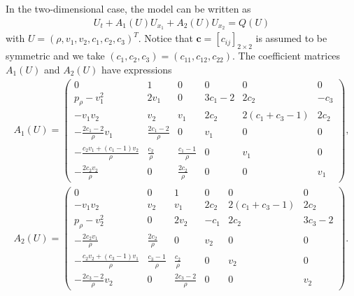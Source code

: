 \documentclass{article}
\theoremstyle{plain}
\begin{document}
In the two-dimensional case, the model can be written as
\begin{eqnarray}\label{25}
  U_t + A_1(U) U_{x_1} + A_2(U) U_{x_2} =Q(U)
\end{eqnarray}
with $U = (\rho, v_1, v_2, c_1, c_2, c_3)^T$.
Notice that $\mathbf{c}=[c_{ij}]_{2\times 2}$ is assumed to be symmetric and we take $(c_1, c_2, c_3)= (c_{11}, c_{12}, c_{22})$. The coefficient matrices $A_1(U)$ and $A_2(U)$ have expressions
\begin{eqnarray*}
  A_1 (U) = \left( \begin{array}{cccccc} 0 & 1 & 0 & 0 & 0 & 0 \\[2mm]
    p_\rho-v_1^2 & 2 v_1 & 0 & 3c_1-2 & 2c_2 & -c_3 \\[2mm]
    -v_1 v_2 &  v_2 & v_1 & 2c_2 & 2(c_1 +c_3 -1) & 2c_2 \\[2mm]
    -\frac{2c_1-2}{\rho} v_1 & \frac{2c_1-2}{\rho} & 0 & v_1 & 0 & 0 \\[2mm]
    -\frac{c_2 v_1 +(c_1-1)v_2}{\rho} & \frac{c_2}{\rho} & \frac{c_1-1}{\rho} & 0 & v_1 & 0 \\[2mm]
    -\frac{2c_2 v_2}{\rho} & 0 & \frac{2c_2}{\rho} & 0 & 0 & v_1
  \end{array} \right), \\[4mm]
  A_2(U) = \left( \begin{array}{cccccc} 0 & 0 & 1 & 0 & 0 & 0 \\[2mm]
    -v_1 v_2 & v_2 & v_1 & 2c_2 & 2(c_1 +c_3-1) & 2c_2 \\[2mm]
    p_\rho-v_2^2 & 0 & 2v_2 & -c_1 & 2c_2 & 3c_3-2 \\[2mm]
    -\frac{2c_2 v_1}{\rho} & \frac{2 c_2}{\rho} & 0 & v_2 & 0 & 0 \\[2mm]
    -\frac{c_2 v_2 +(c_3-1)v_1}{\rho} & \frac{c_3-1}{\rho} & \frac{c_2}{\rho} & 0 & v_2 & 0 \\[2mm]
   -\frac{2c_3-2}{\rho} v_2 & 0 & \frac{2c_3-2}{\rho} & 0 & 0 & v_2 \end{array} \right).
\end{eqnarray*}
\end{document}
